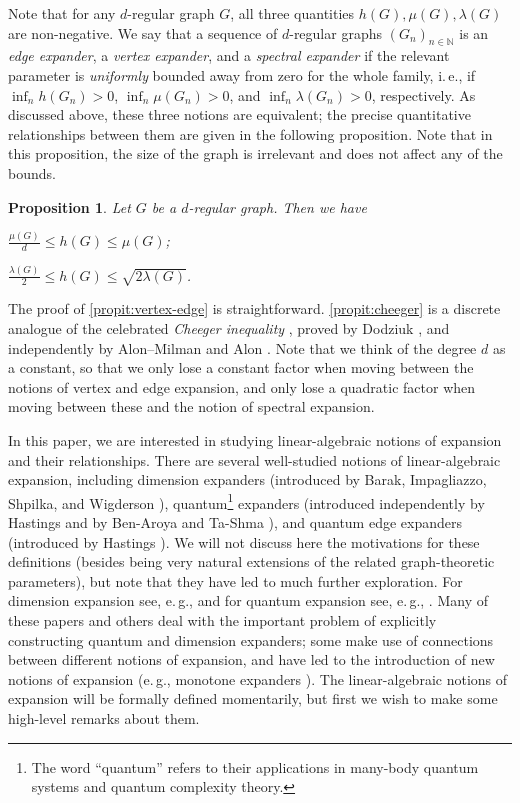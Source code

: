 \documentclass[11pt]{article}
\newtheorem{proposition}[theorem]{Proposition}
\newcommand{\N}{{\mathbb N}}
\newcommand{\ie}{i.\,e.}
\newcommand{\eg}{e.\,g.}
\theoremstyle{plain}
\numberwithin{equation}{section}
\theoremstyle{definition}
\begin{document}
Note that for any $d$-regular graph $G$, all three quantities $h(G), \mu(G), \lambda(G)$ are non-negative. We say that a sequence of $d$-regular graphs $(G_n)_{n \in \N}$ is an \emph{edge expander},
%
%
a \emph{vertex expander}, and a \emph{spectral expander} %
if the relevant parameter is \emph{uniformly} bounded away from zero for the whole family,
%
\ie,     %
if
%
%
%
$\inf_n h(G_n)>0$, $\inf_n \mu(G_n)>0$, and $\inf_n \lambda(G_n)>0$, respectively.  %
As discussed above, these three notions are equivalent; the precise quantitative relationships between them are given in the following proposition. Note that in this proposition, the size of the graph is irrelevant and does not affect any of the bounds.
\begin{proposition}\label{prop: graph expansions relations}
Let $G$ be a $d$-regular graph. Then we have
\begin{propenum}
\item $\frac {\mu(G)}d\leq h(G)\leq \mu(G)$;\label{propit:vertex-edge}
\item $\frac{\lambda(G)}{2}\leq h(G)\leq \sqrt{2\lambda(G)}$.\label{propit:cheeger}
\end{propenum}
\end{proposition}
The proof of \cref{propit:vertex-edge} is straightforward. \cref{propit:cheeger} is a discrete analogue of the celebrated
%
%
\emph{Cheeger inequality}   %
\cite{Cheeger70}, proved by Dodziuk \cite{Dod84}, and independently by Alon--Milman \cite{AM85} and Alon \cite{Alo86}. Note that we think of the degree $d$ as a constant, so that we only lose a constant factor when moving between the notions of vertex and edge expansion, and only lose a quadratic factor when moving between these and the notion of spectral expansion.

In this paper, we are interested in studying linear-algebraic notions of expansion and their relationships. There are several well-studied notions of linear-algebraic expansion, including dimension expanders (introduced by Barak, Impagliazzo, Shpilka, and Wigderson \cite{BISW04}), quantum\footnote{The word ``quantum'' refers to their applications in many-body quantum systems and quantum complexity theory.} expanders (introduced independently by Hastings \cite{Has07} and by Ben-Aroya and Ta-Shma \cite{BT07}), and quantum edge expanders (introduced by Hastings \cite{PhysRevA.76.032315}). We will not discuss here the motivations for these definitions (besides being very natural extensions of the related graph-theoretic parameters), but note that they have led to much further exploration. For dimension expansion see, \eg, \cite{DS09,BOURGAIN2009357,Bourgain2013,DW10,FG15,LUBOTZKY2008730} and for quantum expansion see, \eg, \cite{Harrow08,BST10,10.5555/2011781.2011790,zigzag,FM20,KLR21}. Many of these papers and others deal with the important problem of explicitly constructing quantum and dimension expanders; some make use of connections between different notions of expansion, and have led to the introduction of new notions of expansion (\eg, monotone expanders \cite{DS09,Bourgain2013,DW10}). The linear-algebraic notions of expansion will be formally defined momentarily, but first we wish to make some high-level remarks about them. 
\end{document}
